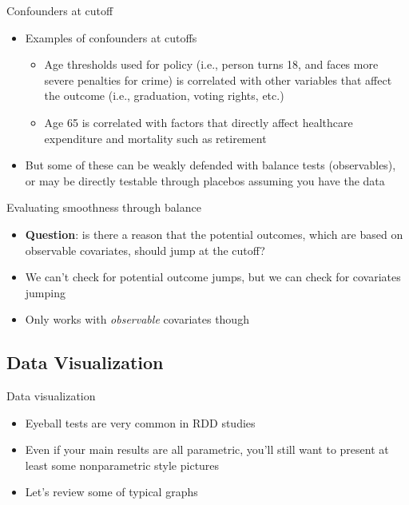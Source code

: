 \documentclass{beamer}
\begin{document}
\begin{frame}{Confounders at cutoff}

\begin{itemize}
\item Examples of confounders at cutoffs
	\begin{itemize}
	\item Age thresholds used for policy (i.e., person turns 18, and faces more severe penalties for crime) is correlated with other variables that affect the outcome (i.e., graduation, voting rights, etc.)
	\item Age 65 is correlated with factors that directly affect healthcare expenditure and mortality such as retirement
	\end{itemize}
\item But some of these can be weakly defended with balance tests (observables), or may be directly testable through placebos assuming you have the data
\end{itemize}

\end{frame}
	
	
\begin{frame}{Evaluating smoothness through balance}
	
	\begin{itemize}
	\item \textbf{Question}: is there a reason that the potential outcomes, which are based on observable covariates, should jump at the cutoff?
	\item We can't check for potential outcome jumps, but we can check for covariates jumping
	\item Only works with \emph{observable} covariates though
	\end{itemize}
\end{frame}



\subsection{Data Visualization}


\begin{frame}{Data visualization}

\begin{itemize}
\item Eyeball tests are very common in RDD studies
\item Even if your main results are all parametric, you'll still want to present at least some nonparametric style pictures
\item Let's review some of typical graphs 
\end{itemize}

\end{frame}	
\end{document}
